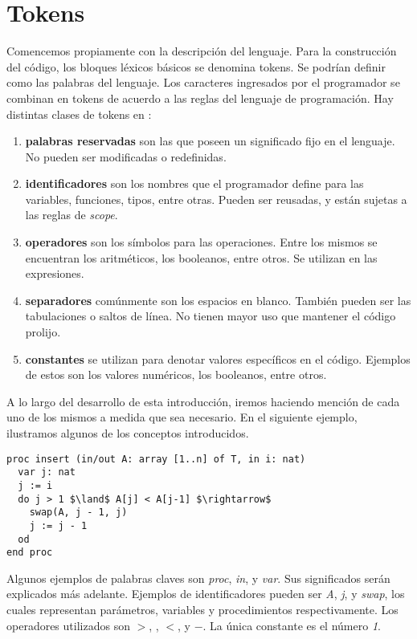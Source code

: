 \documentclass{article}
\begin{document}
\section{Tokens}

Comencemos propiamente con la descripción del lenguaje.
Para la construcción del código, los bloques léxicos básicos se denomina tokens.
Se podrían definir como las palabras del lenguaje.
Los caracteres ingresados por el programador se combinan en tokens de acuerdo a las reglas del lenguaje de programación.
Hay distintas clases de tokens en \Lang:

\begin{enumerate}
\item \textbf{palabras reservadas} son las que poseen un significado fijo en el lenguaje.
No pueden ser modificadas o redefinidas.
\item \textbf{identificadores} son los nombres que el programador define para las variables, funciones, tipos, entre otras.
Pueden ser reusadas, y están sujetas a las reglas de \textit{scope}.
\item \textbf{operadores} son los símbolos para las operaciones.
Entre los mismos se encuentran los aritméticos, los booleanos, entre otros.
Se utilizan en las expresiones.
\item \textbf{separadores} comúnmente son los espacios en blanco.
También pueden ser las tabulaciones o saltos de línea.
No tienen mayor uso que mantener el código prolijo.
\item \textbf{constantes} se utilizan para denotar valores específicos en el código.
Ejemplos de estos son los valores numéricos, los booleanos, entre otros.
\end{enumerate}

A lo largo del desarrollo de esta introducción, iremos haciendo mención de cada uno de los mismos a medida que sea necesario.
En el siguiente ejemplo, ilustramos algunos de los conceptos introducidos.

\begin{lstlisting}
proc insert (in/out A: array [1..n] of T, in i: nat)
  var j: nat
  j := i
  do j > 1 $\land$ A[j] < A[j-1] $\rightarrow$
    swap(A, j - 1, j)
    j := j - 1
  od
end proc
\end{lstlisting}

Algunos ejemplos de palabras claves son \textit{proc}, \textit{in}, y \textit{var}.
Sus significados serán explicados más adelante.
Ejemplos de identificadores pueden ser \textit{A}, \textit{j}, y \textit{swap}, los cuales representan parámetros, variables y procedimientos respectivamente.
Los operadores utilizados son $>$, \sand, $<$, y $-$.
La única constante es el número \textit{1}.
\end{document}
